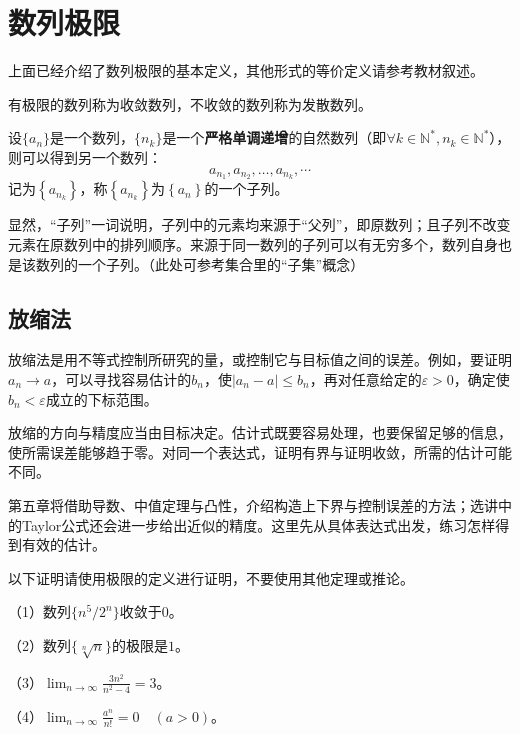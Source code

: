 \newpage
\section{数列极限}
\label{sec:analysis-sequence-limits}
上面已经介绍了数列极限的基本定义，其他形式的等价定义请参考教材叙述。

有极限的数列称为{\heiti{}收敛数列}，不收敛的数列称为{\heiti{}发散数列}。

\begin{definition}[子列]
设\(\{ a_{n} \}\)是一个数列，\(\{ n_{k} \}\)是一个\textbf{严格单调递增}的自然数列（即\(\forall k \in \mathbb{N}^{*} , n_{k} \in \mathbb{N}^{*}\)），则可以得到另一个数列：
\begin{equation*}
    a_{n_{1}} , a_{n_{2}} , \ldots , a_{n_{k}} , \cdots
\end{equation*}
记为\(\left\{ a_{n_{k}} \right\}\)，称\(\left\{ a_{n_{k}} \right\}\)为\(\left\{ a_{n} \right\}\)的一个子列。
\end{definition}

显然，“子列”一词说明，子列中的元素均来源于“父列”，即原数列；且子列不改变元素在原数列中的排列顺序。来源于同一数列的子列可以有无穷多个，数列自身也是该数列的一个子列。（此处可参考集合里的“子集”概念）

\subsection{放缩法}
放缩法是用不等式控制所研究的量，或控制它与目标值之间的误差。例如，要证明\(a_n\to a\)，可以寻找容易估计的\(b_n\)，使\(|a_n-a|\le b_n\)，再对任意给定的\(\varepsilon>0\)，确定使\(b_n<\varepsilon\)成立的下标范围。

放缩的方向与精度应当由目标决定。估计式既要容易处理，也要保留足够的信息，使所需误差能够趋于零。对同一个表达式，证明有界与证明收敛，所需的估计可能不同。

第五章将借助导数、中值定理与凸性，介绍构造上下界与控制误差的方法；选讲中的Taylor公式还会进一步给出近似的精度。这里先从具体表达式出发，练习怎样得到有效的估计。

\begin{example}
    以下证明请使用极限的定义进行证明，不要使用其他定理或推论。

    （1）数列\(\{n^5/2^n\}\)收敛于\(0\)。

    （2）数列\(\{\sqrt[n]{n}\}\)的极限是\(1\)。

    （3）\(\displaystyle\lim_{n\to\infty}\frac{3n^2}{n^2-4}=3\)。

    （4）\(\displaystyle\lim_{n\to\infty}\frac{a^n}{n!}=0\quad(a>0)\)。
\end{example}

